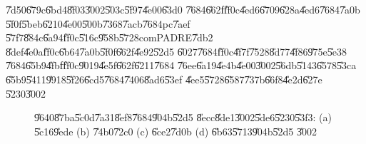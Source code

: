 \documentclass[12pt,a4paper]{article}
\begin{document}
\U{7d50}\U{679c}\U{6bd4}\U{8f03}\U{3002}\U{503c}\U{5f97}\U{4e00}\U{63d0}%
\U{7684}\U{662f}\U{ff0c}\U{4ed6}\U{6709}\U{628a}\U{4ed6}\U{7684}\U{7a0b}%
\U{5f0f}\U{5beb}\U{6210}\U{4e00}\U{500b}\U{7368}\U{7acb}\U{7684}pc\U{7aef}%
\U{57f7}\U{884c}\U{6a94}\U{ff0c}\U{516c}\U{958b}\U{5728}comPADRE\U{7db2}%
\U{8def}\U{4e0a}\U{ff0c}\U{6b64}\U{7a0b}\U{5f0f}\U{662f}\U{4e92}\U{52d5}%
\U{6027}\U{7684}\U{ff0c}\U{4f7f}\U{7528}\U{8d77}\U{4f86}\U{975e}\U{5e38}%
\U{7684}\U{65b9}\U{4fbf}\U{ff0c}\U{9019}\U{4e5f}\U{662f}\U{6211}\U{7684}%
\U{76ee}\U{6a19}\U{4e4b}\U{4e00}\U{3002}\U{56db}\U{5143}\U{6578}\U{53ca}%
\U{65b9}\U{5411}\U{9918}\U{5f26}\U{6cd5}\U{7684}\U{7406}\U{8ad6}\U{53ef}%
\U{4ee5}\U{5728}\cite{rapaport}\U{6587}\U{737b}\U{66f8}\U{4e2d}\U{627e}%
\U{5230}\U{3002}

\begin{figure}[th]
\caption{{}\U{9640}\U{87ba}\U{5c0d}\U{7a31}\U{8ef8}\U{7684}\U{904b}\U{52d5}%
\U{8ecc}\U{8de1}\U{3002}\U{5de6}\U{5230}\U{53f3}: (a) \U{5c16}\U{9ede} (b) 
\U{74b0}\U{72c0} (c) \U{6ce2}\U{7d0b} (d) \U{6b63}\U{5713}\U{904b}\U{52d5}%
\U{3002}}
\label{FourClassics}
\begin{center}
\fbox{\resizebox{\textwidth}{!}{}}
\end{center}
\end{figure}

\bigskip
\end{document}
